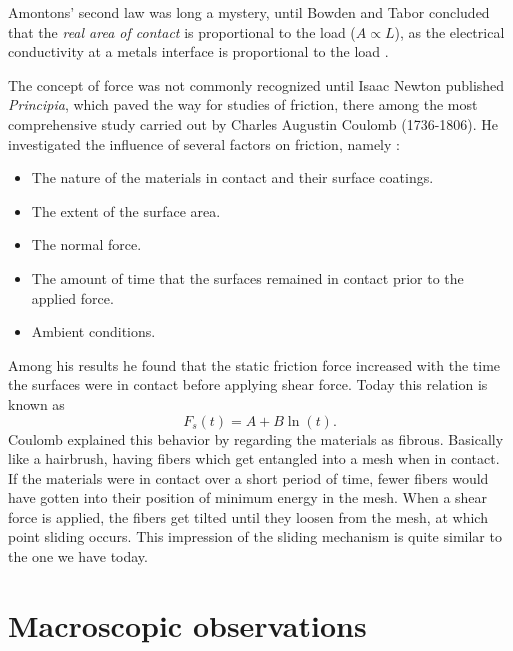 \documentclass[twoside,english]{uiofysmaster}
\begin{document}
Amontons' second law was long a mystery, until Bowden and Tabor concluded that the \textit{real area of contact} is proportional to the load ($A \propto L$), as the electrical conductivity at a metals interface is proportional to the load \cite{bowden2001friction}.
 
The concept of force was not commonly recognized until Isaac Newton published \textit{Principia}, which paved the way for studies of friction, there among the most comprehensive study carried out by Charles Augustin Coulomb (1736-1806). 
He investigated the influence of several factors on friction, namely \cite{SlidingFriction}:
\begin{itemize}
	\item The nature of the materials in contact and their surface coatings.
	\item The extent of the surface area.
	\item The normal force.
	\item The amount of time that the surfaces remained in contact prior to the applied force.
	\item Ambient conditions.
\end{itemize}   
Among his results he found that the static friction force increased with the time the surfaces were in contact before applying shear force. 
Today this relation is known as
\begin{equation}
F_s(t) = A+B\ln(t).
\end{equation}
Coulomb explained this behavior by regarding the materials as fibrous. 
Basically like a hairbrush, having fibers which get entangled into a mesh when in contact. 
If the materials were in contact over a short period of time, fewer fibers would have gotten into their position of minimum energy in the mesh. 
When a shear force is applied, the fibers get tilted until they loosen from the mesh, at which point sliding occurs. 
This impression of the sliding mechanism is quite similar to the one we have today. 




\section{Macroscopic observations}

\end{document}
